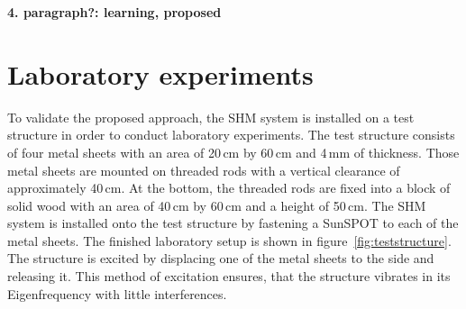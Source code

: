 \documentclass[12pt,a4paper]{scrartcl}
\begin{document}
\textbf{4. paragraph?: learning, proposed}



\newpage
\section*{Laboratory experiments}


To validate the proposed approach, the SHM system is installed on a test structure in order to conduct laboratory experiments.
The test structure consists of four metal sheets with an area of 20\,cm by 60\,cm and 4\,mm of thickness.
Those metal sheets are mounted on threaded rods with a vertical clearance of approximately 40\,cm.
At the bottom, the threaded rods are fixed into a block of solid wood with an area of 40\,cm by 60\,cm and a height of 50\,cm.
The SHM system is installed onto the test structure by fastening a SunSPOT to each of the metal sheets.
The finished laboratory setup is shown in figure~\ref{fig:teststructure}.
The structure is excited by displacing one of the metal sheets to the side and releasing it.
This method of excitation ensures, that the structure vibrates in its Eigenfrequency with little interferences.
\end{document}
